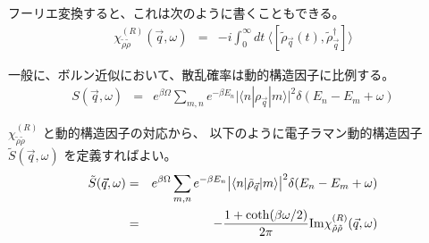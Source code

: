 \documentclass[uplatex,a4j,12pt,dvipdfmx]{jsarticle}
\begin{document}
フーリエ変換すると、これは次のように書くこともできる。
\begin{eqnarray}
	\chi^{(R)}_{\tilde{\rho} \tilde{\rho}}(\vec{q},\omega)
	&=&
	- i \int^{\infty}_{0} \!\! dt \
	\big\langle [ \tilde{\rho}_{\vec{q}}(t) , \tilde{\rho}_{\vec{q}}^{\dagger} ] \big\rangle
\end{eqnarray}


一般に、ボルン近似において、散乱確率は動的構造因子に比例する。
\begin{eqnarray}
	S(\vec{q},\omega)
	&=&
	e^{\beta \Omega}
	\sum_{m,n} e^{- \beta E_{n}}
	\big| \langle n | \rho_{\vec{q}} | m \rangle \big|^{2} \delta (E_{n} - E_{m} + \omega)
\end{eqnarray}


$\chi^{(R)}_{\tilde{\rho} \tilde{\rho}}$ と動的構造因子の対応から、
以下のように電子ラマン動的構造因子 $\tilde{S}(\vec{q},\omega)$ を定義すればよい。
\begin{eqnarray}
	\tilde{S} (\vec{q},\omega)
	&=&
	e^{\beta \Omega}
	\sum_{m,n} e^{- \beta E_{n}}
	\big| \langle n | \tilde{\rho}_{\vec{q}} | m \rangle \big|^{2} \delta (E_{n} - E_{m} + \omega)
	\nonumber \\ &=&
	- \dfrac{1 + {\rm coth} (\beta \omega/2) }{2 \pi}
	{\rm Im} \chi^{(R)}_{\tilde{\rho} \tilde{\rho}} (\vec{q},\omega)
\end{eqnarray}
\end{document}
